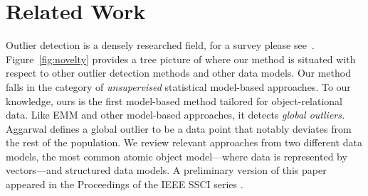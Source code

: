 {				\section{Related Work}
				Outlier detection is a densely researched field, for a survey please see~\cite{aggarwal2013,Akoglu2015}.
				Figure~\ref{fig:novelty} provides a tree picture of where our method is situated with respect to other outlier detection methods and other data models. 
				Our method falls in the category of {\em unsupervised} statistical model-based approaches. To our knowledge, ours is the first model-based method tailored for object-relational data. Like EMM and other model-based approaches, it detects {\em global outliers.} Aggarwal \cite{aggarwal2013} defines a global outlier to be a data point that notably deviates from the rest of the population. We review relevant approaches from two different data models, the most common atomic object model---where data is represented by vectors---and structured data models. A preliminary version of this paper appeared in the Proceedings of the IEEE SSCI series \cite{Riahi2015}. \\
				
}
